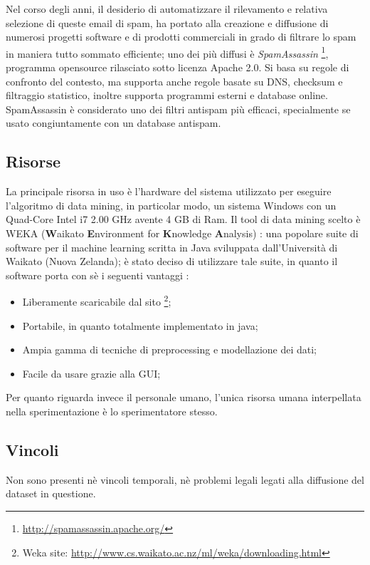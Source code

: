 Nel corso degli anni, il desiderio di automatizzare il rilevamento e relativa selezione di queste email di spam, ha portato alla creazione e diffusione di numerosi progetti software e di prodotti commerciali in grado di filtrare lo spam in maniera tutto sommato efficiente; uno dei più diffusi è \textit{SpamAssassin} \footnote{\url{http://spamassassin.apache.org/}}, programma opensource rilasciato sotto licenza Apache 2.0. Si basa su regole di confronto del contesto, ma supporta anche regole basate su DNS, checksum e filtraggio statistico, inoltre supporta programmi esterni e database online.
SpamAssassin è considerato uno dei filtri antispam più efficaci, specialmente se usato congiuntamente con un database antispam.\cite{wiki:SpamAssassin}

\subsection{Risorse}
La principale risorsa in uso è l'hardware del sistema utilizzato per eseguire l'algoritmo di data mining, in particolar modo, un sistema Windows con un Quad-Core Intel i7 2.00 GHz avente 4 GB di Ram.
Il tool di data mining scelto è WEKA (\textbf{W}aikato \textbf{E}nvironment for \textbf{K}nowledge \textbf{A}nalysis) \cite{WEKA}:
una popolare suite di software per il machine learning scritta in Java sviluppata dall'Università di Waikato (Nuova Zelanda); è stato deciso di utilizzare tale suite, in quanto il software porta con sè i seguenti vantaggi :
\begin{itemize}
	\item Liberamente scaricabile dal sito \footnote{Weka site: \url{http://www.cs.waikato.ac.nz/ml/weka/downloading.html}};
    \item Portabile, in quanto totalmente implementato in java;
    \item Ampia gamma di tecniche di preprocessing e modellazione dei dati;
    \item Facile da usare grazie alla GUI;
\end{itemize}

Per quanto riguarda invece il personale umano, l'unica risorsa umana interpellata nella sperimentazione è lo sperimentatore stesso.

\subsection{Vincoli}
	Non sono presenti nè vincoli temporali, nè problemi legali legati alla diffusione del dataset in questione.

